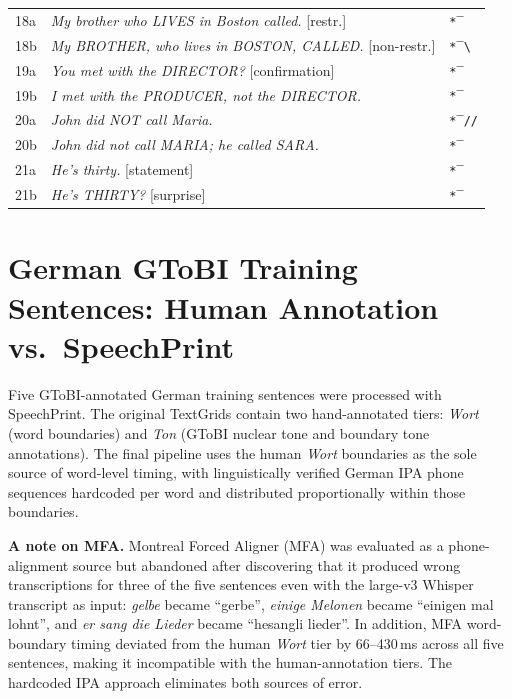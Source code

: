 \begin{longtable}{lll}
18a & \textit{My brother who LIVES in Boston called.} [restr.]   & \texttt{*‾} \\
18b & \textit{My BROTHER, who lives in BOSTON, CALLED.} [non-restr.] & \texttt{*‾\textbackslash} \\
19a & \textit{You met with the DIRECTOR?} [confirmation]         & \texttt{*‾} \\
19b & \textit{I met with the PRODUCER, not the DIRECTOR.}        & \texttt{*‾} \\
20a & \textit{John did NOT call Maria.}                          & \texttt{*‾//} \\
20b & \textit{John did not call MARIA; he called SARA.}          & \texttt{*‾} \\
21a & \textit{He's thirty.} [statement]                          & \texttt{*‾} \\
21b & \textit{He's THIRTY?} [surprise]                           & \texttt{*‾} \\
\end{longtable}


\chapter{German GToBI Training Sentences: Human Annotation vs.\ SpeechPrint}
\label{app:german}

Five GToBI-annotated German training sentences were processed with SpeechPrint.
The original TextGrids contain two hand-annotated tiers: \textit{Wort} (word
boundaries) and \textit{Ton} (GToBI nuclear tone and boundary tone annotations).
The final pipeline uses the human \textit{Wort} boundaries as the sole source of
word-level timing, with linguistically verified German IPA phone sequences
hardcoded per word and distributed proportionally within those boundaries.

\medskip\noindent
\textbf{A note on MFA.}
Montreal Forced Aligner (MFA) was evaluated as a phone-alignment source but
abandoned after discovering that it produced wrong transcriptions for three of
the five sentences even with the large-v3 Whisper transcript as input:
\textit{gelbe} became ``gerbe'', \textit{einige Melonen} became ``einigen mal
lohnt'', and \textit{er sang die Lieder} became ``hesangli lieder''.
In addition, MFA word-boundary timing deviated from the human \textit{Wort} tier
by 66--430\,ms across all five sentences, making it incompatible with the
human-annotation tiers. The hardcoded IPA approach eliminates both sources of
error.

